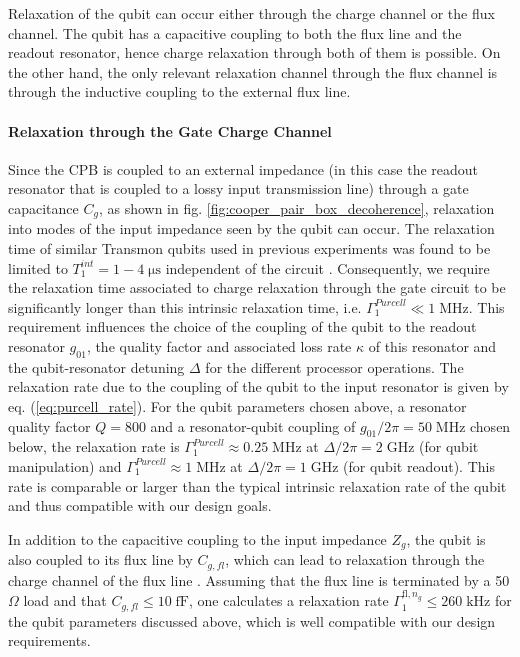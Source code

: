 Relaxation of the qubit can occur either through the charge channel or the flux channel. The qubit has a capacitive coupling to both the flux line and the readout resonator, hence charge relaxation through both of them is possible. On the other hand, the only relevant relaxation channel through the flux channel is through the inductive coupling to the external flux line.

\paragraph{Relaxation through the Gate Charge Channel}

Since the CPB is coupled to an external impedance (in this case the readout resonator that is coupled to a lossy input transmission line) through a gate capacitance $C_g$, as shown in fig. \ref{fig:cooper_pair_box_decoherence}, relaxation into modes of the input impedance seen by the qubit can occur. The relaxation time of similar Transmon qubits used in previous experiments was found to be limited to $T_1^{int}=1-4\;\mathrm{\mu s}$ independent of the circuit \citep{simmonds_decoherence_2004,martinis_decoherence_2005}. Consequently, we require the relaxation time associated to charge relaxation through the gate circuit to be significantly longer than this intrinsic relaxation time, i.e. $\Gamma_1^{Purcell}\ll 1\;\mathrm{MHz}$. This requirement influences the choice of the coupling of the qubit to the readout resonator $g_{01}$, the quality factor and associated loss rate $\kappa$ of this resonator and the qubit-resonator detuning $\Delta$ for the different processor operations. The relaxation rate due to the coupling of the qubit to the input resonator is given by eq. (\ref{eq:purcell_rate}). For the qubit parameters chosen above, a resonator quality factor $Q=800$ and a resonator-qubit coupling of $g_{01}/2\pi=50\;\mathrm{MHz}$ chosen below, the relaxation rate is $\Gamma_1^{Purcell}\approx 0.25\;\mathrm{MHz}$ at $\Delta/2\pi = 2\;\mathrm{GHz}$ (for qubit manipulation) and $\Gamma_1^{Purcell}\approx 1\;\mathrm{MHz}$ at $\Delta/2\pi = 1\;\mathrm{GHz}$ (for qubit readout). This rate is comparable or larger than the typical intrinsic relaxation rate of the qubit and thus compatible with our design goals.

\smallskip

In addition to the capacitive coupling to the input impedance $Z_g$, the qubit is also coupled to its flux line by $C_{g,fl}$, which can lead to relaxation through the charge channel of the flux line \citep{johnson_controlling_2010}. Assuming that the flux line is terminated by a 50 $\Omega$ load and that $C_{g,fl}\le 10\;\mathrm{fF}$, one calculates a relaxation rate $\Gamma_1^{\mathrm{fl},n_g}\le 260 \;\mathrm{kHz}$ for the qubit parameters discussed above, which is well compatible with our design requirements.
 
